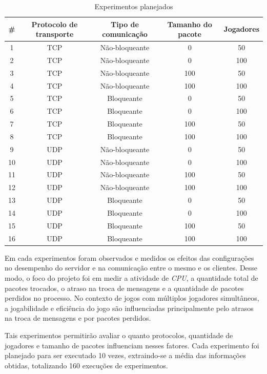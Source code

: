 \documentclass[12pt]{article}
\begin{document}
\begin{table}
  \center
  \footnotesize
  \begin{tabular}{|c|c|c|c|c|}
  \hline
    \#  & \textbf{Protocolo de transporte} & \textbf{Tipo de comunicação} & \textbf{Tamanho do pacote} & \textbf{Jogadores} \\ \hline
    1 & TCP & Não-bloqueante & 0 & 50 \\ \hline
    2 & TCP & Não-bloqueante & 0 & 100 \\ \hline
    3 & TCP & Não-bloqueante & 100 & 50 \\ \hline
    4 & TCP & Não-bloqueante & 100 & 100 \\ \hline
    5 & TCP & Bloqueante & 0 & 50 \\ \hline
    6 & TCP & Bloqueante & 0 & 100 \\ \hline
    7 & TCP & Bloqueante & 100 & 50 \\ \hline
    8 & TCP & Bloqueante & 100 & 100 \\ \hline
    9 & UDP & Não-bloqueante & 0 & 50 \\ \hline
    10 & UDP & Não-bloqueante & 0 & 100 \\ \hline
    11 & UDP & Não-bloqueante & 100 & 50 \\ \hline
    12 & UDP & Não-bloqueante & 100 & 100 \\ \hline
    13 & UDP & Bloqueante & 0 & 50 \\ \hline
    14 & UDP & Bloqueante & 0 & 100 \\ \hline
    15 & UDP & Bloqueante & 100 & 50 \\ \hline
    16 & UDP & Bloqueante & 100 & 100 \\ \hline
  \end{tabular} 
\caption{Experimentos planejados}
\label{tab:experimentos}
\end{table} 

Em cada experimentos foram observados e medidos os efeitos das configurações no
desempenho do servidor e na comunicação entre o mesmo e os clientes. Desse
modo, o foco do projeto foi em medir a atividade de \emph{CPU}, a quantidade total de
pacotes trocados, o atraso na troca de mensagens e a quantidade de pacotes
perdidos no processo. No contexto de jogos com múltiplos jogadores simultâneos,
a jogabilidade e eficiência do jogo são influenciadas principalmente pelo
atrasos na troca de mensagens e por pacotes perdidos.

Tais experimentos permitirão avaliar o quanto protocolos, quantidade de
jogadores e tamanho de pacotes influenciam nesses fatores. Cada experimento
foi planejado para ser executado 10 vezes, extraindo-se a média das informações
obtidas, totalizando 160 execuções de experimentos.
\end{document}
